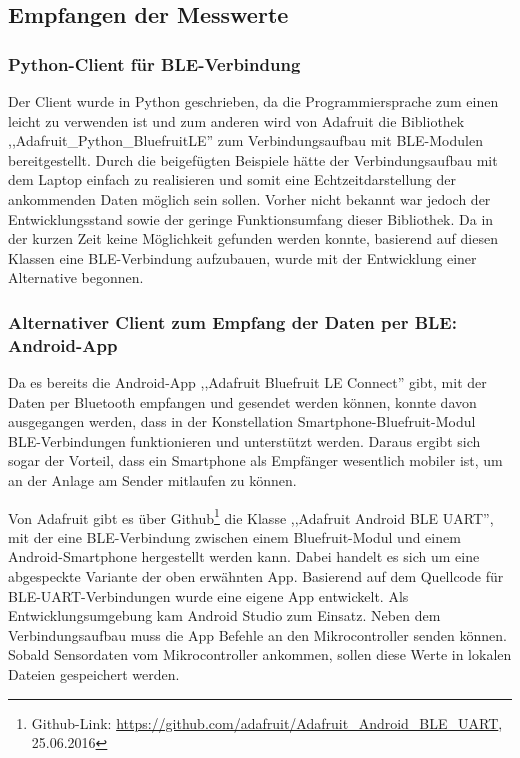 \subsection{Empfangen der Messwerte}
 
\subsubsection{Python-Client für BLE-Verbindung}
\label{BLE_Python_Client}
Der Client wurde in Python geschrieben, da die Programmiersprache zum einen leicht zu verwenden ist und zum anderen wird von Adafruit die Bibliothek ,,Adafruit\_Python\_BluefruitLE'' zum Verbindungsaufbau mit BLE-Modulen bereitgestellt. Durch die beigefügten Beispiele hätte der Verbindungsaufbau mit dem Laptop einfach zu realisieren und somit eine Echtzeitdarstellung der ankommenden Daten möglich sein sollen. Vorher nicht bekannt war jedoch der Entwicklungsstand sowie der geringe Funktionsumfang dieser Bibliothek. Da in der kurzen Zeit keine Möglichkeit gefunden werden konnte, basierend auf diesen Klassen eine BLE-Verbindung aufzubauen, wurde mit der Entwicklung einer Alternative begonnen.

\subsubsection{Alternativer Client zum Empfang der Daten per BLE: Android-App}
\label{AndroidAppFürDatenmessen}
Da es bereits die Android-App ,,Adafruit Bluefruit LE Connect'' gibt, mit der Daten per Bluetooth empfangen und gesendet werden können, konnte davon ausgegangen werden, dass in der Konstellation Smartphone-Bluefruit-Modul BLE-Verbindungen funktionieren und unterstützt werden. Daraus ergibt sich sogar der Vorteil, dass ein Smartphone als Empfänger wesentlich mobiler ist, um an der Anlage am Sender mitlaufen zu können. 

Von Adafruit gibt es über Github\footnote{Github-Link: \url{https://github.com/adafruit/Adafruit_Android_BLE_UART}, 25.06.2016} die Klasse ,,Adafruit Android BLE UART'', mit der eine BLE-Verbindung zwischen einem Bluefruit-Modul und einem Android-Smartphone hergestellt werden kann. Dabei handelt es sich um eine abgespeckte Variante der oben erwähnten App. Basierend auf dem Quellcode für BLE-UART-Verbindungen wurde eine eigene App entwickelt. Als Entwicklungsumgebung kam Android Studio zum Einsatz. Neben dem Verbindungsaufbau muss die App Befehle an den Mikrocontroller senden können. Sobald Sensordaten vom Mikrocontroller ankommen, sollen diese Werte in lokalen Dateien gespeichert werden.

